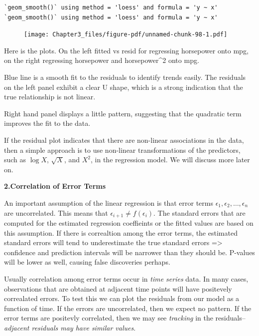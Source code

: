 \documentclass[
  letterpaper,
  DIV=11,
  numbers=noendperiod]{scrreprt}
\begin{document}
\begin{verbatim}
`geom_smooth()` using method = 'loess' and formula = 'y ~ x'
`geom_smooth()` using method = 'loess' and formula = 'y ~ x'
\end{verbatim}

\begin{figure}[H]

{\centering \texttt{[image: Chapter3\_files/figure-pdf/unnamed-chunk-98-1.pdf]}

}

\end{figure}

Here is the plots. On the left fitted vs resid for regressing horsepower
onto mpg, on the right regressing horsepower and horsepower\^{}2 onto
mpg.

Blue line is a smooth fit to the residuals to identify trends easily.
The residuals on the left panel exhibit a clear U shape, which is a
strong indication that the true relationship is not linear.

Right hand panel displays a little pattern, suggesting that the
quadratic term improves the fit to the data.

If the residual plot indicates that there are non-linear associations in
the data, then a simple approach is to use non-linear transformations of
the predictors, such as \(\log X\), \(\sqrt{X}\), and \(X^2\), in the
regression model. We will discuss more later on.

\textbf{2.Correlation of Error Terms}

An important assumption of the linear regression is that error terms
\(\epsilon_1, \epsilon_2, \dots, \epsilon_n\) are uncorrelated. This
means that \(\epsilon_{i+1} \neq f(\epsilon_i)\). The standard errors
that are computed for the estimated regression coeffieints or the fitted
values are based on this assumption. If there is correaltion among the
error terms, the estimated standard errors will tend to underestimate
the true standard errors =\textgreater{} confidence and prediction
intervals will be narrower than they should be. P-values will be lower
as well, causing false discoveries perhaps.

Usually correlation among error terms occur in \emph{time series} data.
In many cases, observations that are obtained at adjacent time points
will have positevely correalated errors. To test this we can plot the
residuals from our model as a function of time. If the errors are
uncorrelated, then we expect no pattern. If the error terms are
positevly correlated, then we may see \emph{tracking} in the
residuals--\emph{adjacent residuals may have similar values}.
\end{document}

